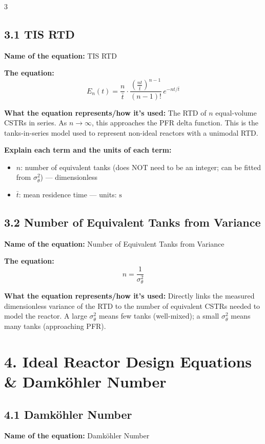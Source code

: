 \documentclass[8pt]{extarticle}
\begin{document}
\begin{multicols*}{3}
\subsection*{3.1 TIS RTD}

\textbf{Name of the equation:} TIS RTD

\textbf{The equation:}
\[
E_n(t)
=
\frac{n}{\bar{t}}
\cdot
\frac{\left(\frac{nt}{\bar{t}}\right)^{n-1}}{(n-1)!}
\,e^{-nt/\bar{t}}
\]

\textbf{What the equation represents/how it's used:} The RTD of \(n\) equal-volume CSTRs in series. As \(n\to\infty\), this approaches the PFR delta function. This is the tanks-in-series model used to represent non-ideal reactors with a unimodal RTD.

\textbf{Explain each term and the units of each term:}
\begin{itemize}
\item \(n\): number of equivalent tanks (does NOT need to be an integer; can be fitted from \(\sigma_\theta^2\)) --- dimensionless
\item \(\bar{t}\): mean residence time --- units: \(\mathrm{s}\)
\end{itemize}

\subsection*{3.2 Number of Equivalent Tanks from Variance}

\textbf{Name of the equation:} Number of Equivalent Tanks from Variance

\textbf{The equation:}
\[
n=\frac{1}{\sigma_\theta^2}
\]

\textbf{What the equation represents/how it's used:} Directly links the measured dimensionless variance of the RTD to the number of equivalent CSTRs needed to model the reactor. A large \(\sigma_\theta^2\) means few tanks (well-mixed); a small \(\sigma_\theta^2\) means many tanks (approaching PFR).

\section*{4. Ideal Reactor Design Equations \& Damk\"ohler Number}

\subsection*{4.1 Damk\"ohler Number}

\textbf{Name of the equation:} Damk\"ohler Number


\end{multicols*}
\end{document}
